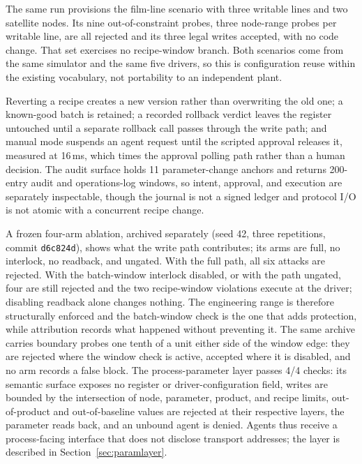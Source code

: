 The same run provisions the film-line scenario with three writable lines and two
satellite nodes. Its nine out-of-constraint probes, three node-range probes per writable line, are all rejected and its three legal writes accepted, with no code change. That set exercises no recipe-window branch. Both scenarios come from the same
simulator and the same five drivers, so this is configuration reuse within the
existing vocabulary, not portability to an independent plant.

Reverting a recipe creates a
new version rather than overwriting the old one; a known-good batch is retained; a
recorded rollback verdict leaves the register untouched until a separate rollback
call passes through the write path; and manual mode suspends an agent request until
the scripted approval releases it, measured at 16\,ms, which times the approval polling path rather than a human decision. The audit
surface holds 11 parameter-change anchors and returns 200-entry audit and
operations-log windows, so intent, approval, and execution are separately
inspectable, though the journal is not a signed ledger and protocol I/O is not
atomic with a concurrent recipe change.

A frozen four-arm ablation, archived separately (seed 42, three repetitions, commit \texttt{d6c824d}), shows what the write path contributes; its arms are full, no interlock, no readback, and ungated. With the full path, all six attacks are rejected. With the batch-window interlock disabled, or with the path ungated, four are still rejected and the two recipe-window violations execute at the driver; disabling readback alone changes nothing. The engineering range is therefore structurally enforced and the batch-window check is the one that adds protection, while attribution records what happened without preventing it. The same archive carries boundary probes one tenth of a unit either side of the window edge: they are rejected where the window check is active, accepted where it is disabled, and no arm records a false block. The process-parameter layer passes 4/4 checks: its semantic surface exposes no
register or driver-configuration field, writes are bounded by the intersection of
node, parameter, product, and recipe limits, out-of-product and out-of-baseline
values are rejected at their respective layers, the parameter reads back, and an
unbound agent is denied. Agents thus receive a process-facing interface that does
not disclose transport addresses; the layer is described in Section~\ref{sec:paramlayer}.

